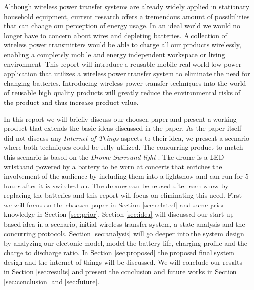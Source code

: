 %
Although wireless power transfer systems are already widely applied in stationary household equipment, current research offers a tremendous amount of possibilities that can change our perception of energy usage. In an ideal world we would no longer have to concern about wires and depleting batteries. A collection of wireless power transmitters would be able to charge all our products wirelessly, enabling a completely mobile and energy independent workspace or living environment. This report will introduce a reusable mobile real-world low power application that utilizes a wireless power transfer system to eliminate the need for changing batteries. Introducing wireless power transfer techniques into the world of reusable high quality products will greatly reduce the environmental risks of the product and thus increase product value.

In this report we will briefly discuss our choosen paper \cite{paper} and present a working product that extends the basic ideas discussed in the paper. As the paper itself did not discuss any \emph{Internet of Things} aspects to their idea, we present a scenario where both techniques could be fully utilized. The concurring product to match this scenario is based on the \emph{Drome Surround light} \cite{drome}. The drome is a LED wristband powered by a battery to be worn at concerts that enriches the involvement of the audience by including them into a lightshow and can run for 5 hours after it is switched on. The dromes can be reused after each show by replacing the batteries and this report will focus on eliminating this need. First we will focus on the choosen paper in Section \ref{sec:related} and some prior knowledge in Section \ref{sec:prior}. Section \ref{sec:idea} will discussed our start-up based idea in a scenario, initial wireless transfer system, a state analysis and the concurring protocols. Section \ref{sec:analysis} will go deeper into the system design by analyzing our electonic model, model the battery life, charging profile and the charge to discharge ratio. In Section \ref{sec:proposed} the proposed final system design and the internet of things will be discussed. We will conclude our results in Section \ref{sec:results} and present the conclusion and future works in Section \ref{sec:conclusion} and \ref{sec:future}.
